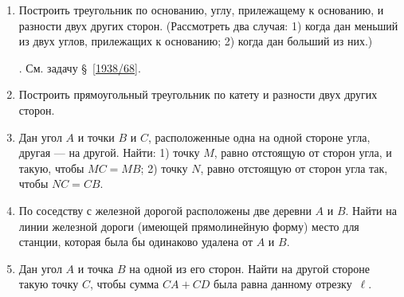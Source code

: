 {\begin{enumerate}
\item
Построить треугольник по основанию, углу, прилежащему к основанию, и разности двух других сторон.
(Рассмотреть два случая:
1) когда дан меньший из двух углов, прилежащих к основанию;
2) когда дан больший из них.)

\smallskip
{}.
См. задачу §~\ref{1938/68}.

\item
Построить прямоугольный треугольник по катету и разности двух других сторон.

\item
Дан угол $A$ и точки $B$ и $C$, расположенные одна на одной стороне угла, другая — на другой.
Найти:
1) точку $M$, равно отстоящую от сторон угла, и такую, чтобы $MC=MB$;
2) точку $N$, равно отстоящую от сторон угла так, чтобы $NC=CB$.

\item
По соседству с железной дорогой расположены две деревни $A$ и $B$.
Найти на линии железной дороги (имеющей прямолинейную форму) место для станции, которая была бы одинаково удалена от $A$ и $B$.

\item
Дан угол $A$ и точка $B$ на одной из его сторон.
Найти на другой стороне такую точку $C$, чтобы сумма $CA+CD$ была равна данному отрезку~$\ell$.

\end{enumerate}

}
